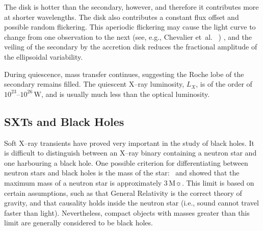 \vspace{\myparskip}

The disk is hotter than the secondary, however, and therefore it contributes more at shorter wavelengths.
The disk also contributes a constant flux offset and
possible random flickering. This aperiodic flickering may cause the light curve to change
from one observation to the next (see, e.g., Chevalier et~al.\ %
)%
, and the veiling of the secondary by the accretion disk reduces the
fractional amplitude of the ellipsoidal variability. %

\vspace{\myparskip}

During quiescence, mass transfer continues, suggesting the Roche lobe
of the secondary remains filled. The quiescent X--ray luminosity,
$L_X$, is of the order of $10^{23}$--$10^{26}\,\mathrm{W}$, and is
usually much less than the optical luminosity.


\subsection{SXTs and Black Holes}\label{cha:Introduction:sec:X--rayBinaries:subsec:BHCSXTs}

Soft X--ray transients have proved very important in the study of
black holes. It is difficult to distinguish between an X--ray binary containing a neutron star and one harbouring a black hole. One possible criterion for differentiating between neutron stars and
black holes is the mass of the star: %
\ and %
showed that the maximum mass of a neutron star is approximately
$3\,\mathrm{M}\sun$. %
This limit is based on certain assumptions, such as that General Relativity
is the correct theory of gravity, and that causality holds inside the
neutron star (i.e., sound cannot travel faster than light). Nevertheless, compact objects with masses greater than this limit are generally considered to be black holes.

\vspace{\myparskip}

